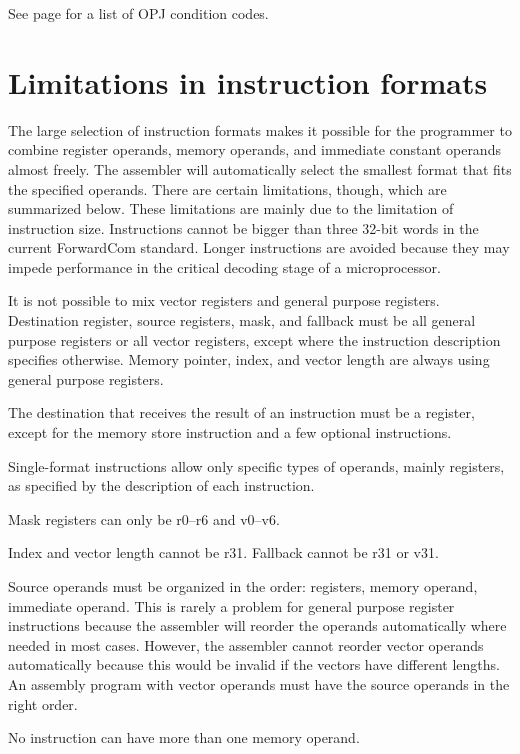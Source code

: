 \documentclass[forwardcom.tex]{subfiles}
\begin{document}
See page \pageref{table:controlTransferInstructions} for a list of OPJ condition codes.
\vv


\section{Limitations in instruction formats} \label{formatLimitations}
The large selection of instruction formats makes it possible for the programmer to combine register operands, memory operands, and immediate constant operands almost freely. The assembler will automatically select the smallest format that fits the specified operands. 
There are certain limitations, though, which are summarized below. These limitations are mainly due to the limitation of instruction size. Instructions cannot be bigger than three 32-bit words in the current ForwardCom standard. Longer instructions are avoided because they may impede performance in the critical decoding stage of a microprocessor.
\vv

It is not possible to mix vector registers and general purpose registers. Destination register, source registers, mask, and fallback must be all general purpose registers or all vector registers, except where the instruction description specifies otherwise. Memory pointer, index, and vector length are always using general purpose registers.
\vv

The destination that receives the result of an instruction must be a register, except for the memory store instruction and a few optional instructions.
\vv

Single-format instructions allow only specific types of operands, mainly registers, as specified by the description of each instruction.
\vv

Mask registers can only be r0--r6 and v0--v6.
\vv

Index and vector length cannot be r31. Fallback cannot be r31 or v31.
\vv

Source operands must be organized in the order: registers, memory operand, immediate operand. This is rarely a problem for general purpose register instructions because the assembler will reorder the operands automatically where needed in most cases. However, the assembler cannot reorder vector operands automatically because this would be invalid if the vectors have different lengths. An assembly program with vector operands must have the source operands in the right order.
\vv

No instruction can have more than one memory operand.
\vv
\end{document}
